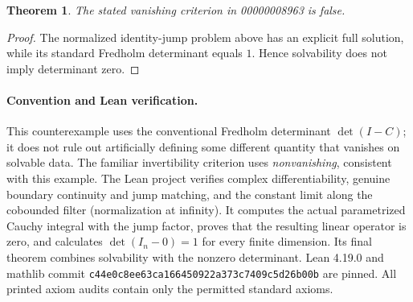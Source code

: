 \documentclass[11pt]{article}
\newtheorem{theorem}{Theorem}
\begin{document}
\begin{theorem}
The stated vanishing criterion in 00000008963 is false.
\end{theorem}
\begin{proof}
The normalized identity-jump problem above has an explicit full
solution, while its standard Fredholm determinant equals $1$.
Hence solvability does not imply determinant zero.
\end{proof}

\paragraph{Convention and Lean verification.}
This counterexample uses the conventional Fredholm determinant
$\det(I-C)$; it does not rule out artificially defining some different
quantity that vanishes on solvable data. The familiar invertibility
criterion uses \emph{nonvanishing}, consistent with this example.
The Lean project verifies complex differentiability, genuine boundary
continuity and jump matching, and the constant limit along the
cobounded filter (normalization at infinity). It computes the actual
parametrized Cauchy integral with the jump factor, proves that the
resulting linear operator is zero, and calculates $\det(I_n-0)=1$
for every finite dimension. Its final theorem combines solvability
with the nonzero determinant. Lean 4.19.0 and mathlib commit
\texttt{c44e0c8ee63ca166450922a373c7409c5d26b00b} are pinned.
All printed axiom audits contain only the permitted standard axioms.
\end{document}
